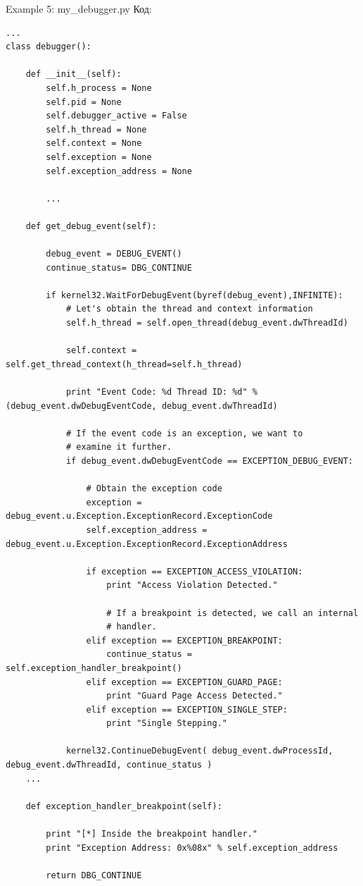 \documentclass[12pt, a4paper, oneside]{book}
\begin{document}
Example 5: my\_debugger.py
Код:
\begin{verbatim}
...
class debugger():

    def __init__(self):
        self.h_process = None
        self.pid = None
        self.debugger_active = False
        self.h_thread = None
        self.context = None
        self.exception = None
        self.exception_address = None

        ...

    def get_debug_event(self):

        debug_event = DEBUG_EVENT()
        continue_status= DBG_CONTINUE

        if kernel32.WaitForDebugEvent(byref(debug_event),INFINITE):
            # Let's obtain the thread and context information
            self.h_thread = self.open_thread(debug_event.dwThreadId)

            self.context = self.get_thread_context(h_thread=self.h_thread)

            print "Event Code: %d Thread ID: %d" % (debug_event.dwDebugEventCode, debug_event.dwThreadId)

            # If the event code is an exception, we want to
            # examine it further.
            if debug_event.dwDebugEventCode == EXCEPTION_DEBUG_EVENT:

                # Obtain the exception code
                exception = debug_event.u.Exception.ExceptionRecord.ExceptionCode
                self.exception_address = debug_event.u.Exception.ExceptionRecord.ExceptionAddress

                if exception == EXCEPTION_ACCESS_VIOLATION:
                    print "Access Violation Detected."

                    # If a breakpoint is detected, we call an internal
                    # handler.
                elif exception == EXCEPTION_BREAKPOINT:
                    continue_status = self.exception_handler_breakpoint()
                elif exception == EXCEPTION_GUARD_PAGE:
                    print "Guard Page Access Detected."
                elif exception == EXCEPTION_SINGLE_STEP:
                    print "Single Stepping."

            kernel32.ContinueDebugEvent( debug_event.dwProcessId, debug_event.dwThreadId, continue_status )
    ...

    def exception_handler_breakpoint(self):

        print "[*] Inside the breakpoint handler."
        print "Exception Address: 0x%08x" % self.exception_address

        return DBG_CONTINUE
\end{verbatim}
\end{document}
